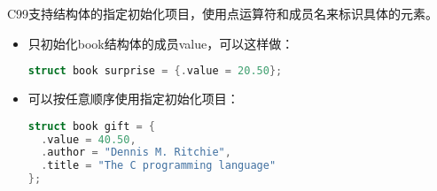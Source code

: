 \begin{frame}[fragile]
C99支持结构体的指定初始化项目，使用点运算符和成员名来标识具体的元素。
\begin{itemize}
\item 只初始化{\tf book}结构体的成员{\tf value}，可以这样做：
  \begin{lstlisting}[language=c,backgroundcolor=\color{red!20}]
struct book surprise = {.value = 20.50};    
  \end{lstlisting}
\item 可以按任意顺序使用指定初始化项目：
  \begin{lstlisting}[language=c,backgroundcolor=\color{red!20}]
struct book gift = {
  .value = 40.50,
  .author = "Dennis M. Ritchie",
  .title = "The C programming language"
};    
  \end{lstlisting}

\end{itemize}
\end{frame}
